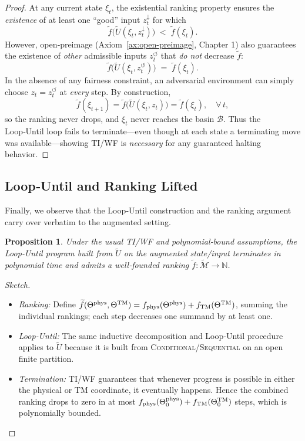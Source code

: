 \documentclass[12pt]{article}
\theoremstyle{definition}
\theoremstyle{plain}
\newtheorem{proposition}{Proposition}[section]
\begin{document}
\begin{proof}
At any current state \(\xi_t\), the existential ranking property ensures the \emph{existence} of at least one “good” input \(z^\downarrow_t\) for which
\[
  \widetilde f\bigl(\widetilde U(\xi_t,z^\downarrow_t)\bigr)
  \;<\;\widetilde f(\xi_t).
\]
However, open‐preimage (Axiom~\ref{ax:open-preimage}, Chapter 1) also guarantees the existence of \emph{other} admissible inputs \(z^\circlearrowleft_t\) that \emph{do not} decrease \(\widetilde f\):
\[
  \widetilde f\bigl(\widetilde U(\xi_t,z^\circlearrowleft_t)\bigr)
  \;=\;\widetilde f(\xi_t).
\]
In the absence of any fairness constraint, an adversarial environment can simply choose \(z_t = z^\circlearrowleft_t\) at \emph{every} step.  By construction,
\[
  \widetilde f(\xi_{t+1}) 
  = \widetilde f\bigl(\widetilde U(\xi_t,z_t)\bigr)
  = \widetilde f(\xi_t),
  \quad\forall\,t,
\]
so the ranking never drops, and \(\xi_t\) never reaches the basin \(\mathcal B\).  Thus the Loop‑Until loop fails to terminate—even though at each state a terminating move was available—showing TI/WF is \emph{necessary} for any guaranteed halting behavior.
\end{proof}



\subsection{Loop‑Until and Ranking Lifted}
\label{subsec:augmented-loop-until-ranking}

Finally, we observe that the Loop‑Until construction and the ranking
argument carry over verbatim to the augmented setting.

\begin{proposition}
Under the usual TI/WF and polynomial‐bound assumptions, the Loop‑Until
program built from \(\widetilde U\) on the augmented state/input
terminates in polynomial time and admits a well‐founded ranking
\(\widetilde f:\widetilde{\mathcal M}\to\mathbb N\).
\end{proposition}

\begin{proof}[Sketch]
\begin{itemize}
  \item \emph{Ranking:} Define 
    \(\widetilde f(\Theta^{\rm phys},\Theta^{\rm TM})
      = f_{\rm phys}(\Theta^{\rm phys}) + f_{\rm TM}(\Theta^{\rm TM})\),
    summing the individual rankings; each step decreases one summand
    by at least one.
  \item \emph{Loop‑Until:} The same inductive decomposition and
    Loop‑Until procedure applies to \(\widetilde U\) because it is
    built from \textsc{Conditional}/\textsc{Sequential} on an open
    finite partition.  
  \item \emph{Termination:} TI/WF guarantees that whenever progress is
    possible in either the physical or TM coordinate, it eventually
    happens.  Hence the combined ranking drops to zero in at most
    \(f_{\rm phys}(\Theta^{\rm phys}_0) + f_{\rm TM}(\Theta^{\rm TM}_0)\)
    steps, which is polynomially bounded.
\end{itemize}
\end{proof}
\end{document}

